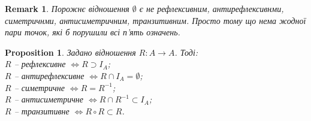 \documentclass[a4paper, 14pt]{extarticle}
\theoremstyle{theoremdd}
\theoremstyle{theoremdd}
\theoremstyle{theoremdd}
\theoremstyle{theoremdd}
\theoremstyle{theoremdd}
\theoremstyle{theoremdd}
\theoremstyle{theoremdd}
\theoremstyle{theoremdd}
\theoremstyle{theoremdd}
\newtheorem{proposition}[theorem]{Proposition}
\theoremstyle{theoremdd}
\theoremstyle{theoremdd}
\newtheorem{remark}[theorem]{Remark}
\theoremstyle{theoremdd}
\theoremstyle{theoremdd}
\theoremstyle{theoremdd}
\theoremstyle{theoremdd}
\begin{document}
\begin{remark}
Порожнє відношення $\emptyset$ є не рефлексивним, антирефлексивнми, симетричнми, антисиметричним, транзитивним. Просто тому що нема жодної пари точок, які б порушили всі п'ять означень.
\end{remark}

\begin{proposition}
Задано відношення $R \colon A \to A$. Тоді:\\
$R$ -- рефлексивне $\iff R \supset I_A$;\\
$R$ -- антирефлексивне $\iff R \cap I_A = \emptyset$;\\
$R$ -- симетричне $\iff R = R^{-1}$;\\
$R$ -- антисиметричне $\iff R \cap R^{-1} \subset I_A$;\\
$R$ -- транзитивне $\iff R \circ R \subset R$.
\end{proposition}
\end{document}
